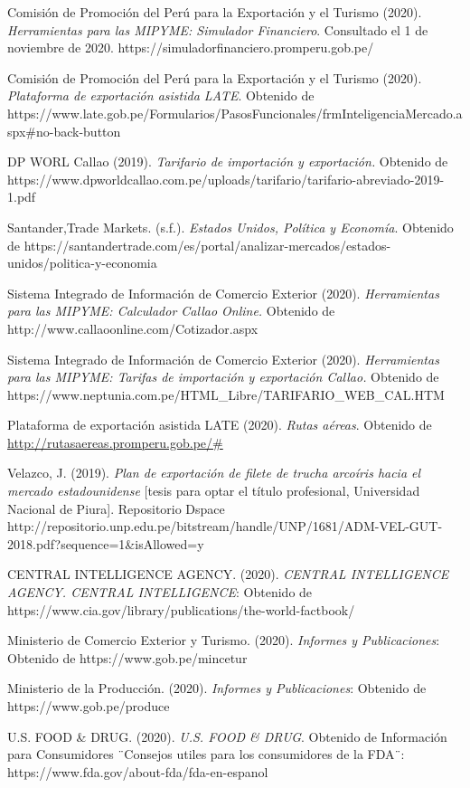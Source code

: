 \documentclass[
  stu,
  floatsintext,
  longtable,
  a4paper,
  nolmodern,
  notxfonts,
  notimes,
  colorlinks=true,linkcolor=blue,citecolor=blue,urlcolor=blue]{apa7}
\begin{document}
Comisión de Promoción del Perú para la Exportación y el Turismo (2020).
\emph{Herramientas para las MIPYME: Simulador Financiero}. Consultado el
1 de noviembre de 2020. https://simuladorfinanciero.promperu.gob.pe/

Comisión de Promoción del Perú para la Exportación y el Turismo (2020).
\emph{Plataforma de exportación asistida LATE}. Obtenido de
https://www.late.gob.pe/Formularios/PasosFuncionales/frmInteligenciaMercado.aspx\#no-back-button

DP WORL Callao (2019). \emph{Tarifario de importación y exportación.}
Obtenido de
https://www.dpworldcallao.com.pe/uploads/tarifario/tarifario-abreviado-2019-1.pdf

Santander,Trade Markets. (s.f.). \emph{Estados Unidos, Política y
Economía}. Obtenido de
https://santandertrade.com/es/portal/analizar-mercados/estados-unidos/politica-y-economia

Sistema Integrado de Información de Comercio Exterior (2020).
\emph{Herramientas para las MIPYME: Calculador Callao Online.} Obtenido
de http://www.callaoonline.com/Cotizador.aspx

Sistema Integrado de Información de Comercio Exterior (2020).
\emph{Herramientas para las MIPYME: Tarifas de importación y exportación
Callao.} Obtenido de
https://www.neptunia.com.pe/HTML\_Libre/TARIFARIO\_WEB\_CAL.HTM

Plataforma de exportación asistida LATE (2020). \emph{Rutas aéreas}.
Obtenido de
\href{http://rutasaereas.promperu.gob.pe/}{http://rutasaereas.promperu.gob.pe/\#}

Velazco, J. (2019). \emph{Plan de exportación de filete de trucha
arcoíris hacia el mercado estadounidense} {[}tesis para optar el título
profesional, Universidad Nacional de Piura{]}. Repositorio Dspace
http://repositorio.unp.edu.pe/bitstream/handle/UNP/1681/ADM-VEL-GUT-2018.pdf?sequence=1\&isAllowed=y

CENTRAL INTELLIGENCE AGENCY. (2020). \emph{CENTRAL INTELLIGENCE AGENCY.
CENTRAL INTELLIGENCE}: Obtenido de
https://www.cia.gov/library/publications/the-world-factbook/

Ministerio de Comercio Exterior y Turismo. (2020). \emph{Informes y
Publicaciones}: Obtenido de https://www.gob.pe/mincetur

Ministerio de la Producción. (2020). \emph{Informes y Publicaciones}:
Obtenido de https://www.gob.pe/produce

U.S. FOOD \& DRUG. (2020). \emph{U.S. FOOD \& DRUG}. Obtenido de
Información para Consumidores ¨Consejos utiles para los consumidores de
la FDA¨: https://www.fda.gov/about-fda/fda-en-espanol
\end{document}
